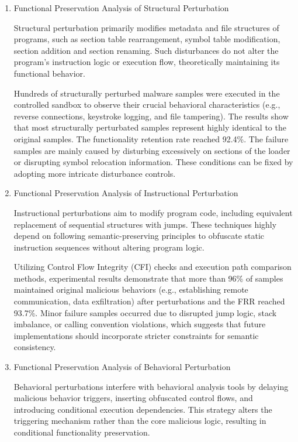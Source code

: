 \begin{enumerate}

\item Functional Preservation Analysis of Structural Perturbation

Structural perturbation primarily modifies metadata and file structures of programs, such as section table rearrangement, symbol table modification, section addition and section renaming. Such disturbances do not alter the program's instruction logic or execution flow, theoretically maintaining its functional behavior.

Hundreds of structurally perturbed malware samples were executed in the controlled sandbox to observe their crucial behavioral characteristics (e.g., reverse connections, keystroke logging, and file tampering). The results show that most structurally perturbated samples represent highly identical to the original samples. The functionality retention rate reached 92.4\%. The failure samples are mainly caused by disturbing excessively on sections of the loader or disrupting symbol relocation information. These conditions can be fixed by adopting more intricate disturbance controls.

\item Functional Preservation Analysis of Instructional Perturbation

Instructional perturbations aim to modify program code, including equivalent replacement of sequential structures with jumps. These techniques highly depend on following semantic-preserving principles to obfuscate static instruction sequences without altering program logic.

Utilizing Control Flow Integrity (CFI) checks and execution path comparison methods, experimental results demonstrate that more than 96\% of samples maintained original malicious behaviors (e.g., establishing remote communication, data exfiltration) after perturbations and the FRR reached 93.7\%. Minor failure samples occurred due to disrupted jump logic, stack imbalance, or calling convention violations, which suggests that future implementations should incorporate stricter constraints for semantic consistency.

\item Functional Preservation Analysis of Behavioral Perturbation

Behavioral perturbations interfere with behavioral analysis tools by delaying malicious behavior triggers, inserting obfuscated control flows, and introducing conditional execution dependencies. This strategy alters the triggering mechanism rather than the core malicious logic, resulting in conditional functionality preservation.

\end{enumerate}

